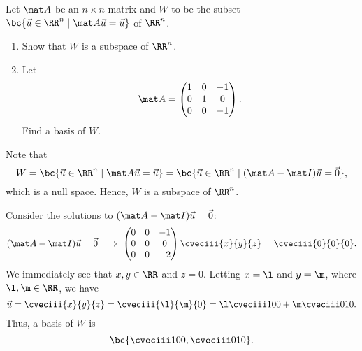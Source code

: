 \begin{problem}
    Let $\mat A$ be an $n \times n$ matrix and $W$ to be the subset $\bc{\vec u \in \RR^n \mid \mat A \vec u = \vec u}$ of $\RR^n$.

    \begin{enumerate}
        \item Show that $W$ is a subspace of $\RR^n$.
        \item Let \[\mat A = \begin{pmatrix}1 & 0 & -1 \\ 0 & 1 & 0 \\ 0 & 0 & -1\end{pmatrix}.\] Find a basis of $W$.
    \end{enumerate}
\end{problem}
\begin{solution}
    \begin{ppart}
        Note that \[W = \bc{\vec u \in \RR^n \mid \mat A \vec u = \vec u} = \bc{\vec u \in \RR^n \mid (\mat A - \mat I) \vec u = \vec 0},\] which is a null space. Hence, $W$ is a subspace of $\RR^n$.
    \end{ppart}
    \begin{ppart}
        Consider the solutions to $(\mat A - \mat I) \vec u = \vec 0$: \[(\mat A - \mat I) \vec u = \vec 0 \implies \begin{pmatrix}0 & 0 & -1 \\ 0 & 0 & 0 \\ 0 & 0 & -2 \end{pmatrix} \cveciii{x}{y}{z} = \cveciii{0}{0}{0}.\] We immediately see that $x, y \in \RR$ and $z = 0$. Letting $x = \l$ and $y = \m$, where $\l, \m \in \RR$, we have \[\vec u = \cveciii{x}{y}{z} = \cveciii{\l}{\m}{0} = \l \cveciii100 + \m \cveciii010.\] Thus, a basis of $W$ is \[\bc{\cveciii100, \cveciii010}.\]
    \end{ppart}
\end{solution}

